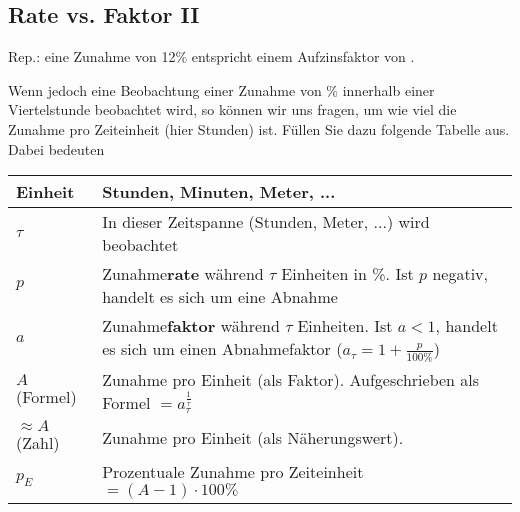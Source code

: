 \subsection{Rate vs. Faktor
  II}

Rep.: eine Zunahme von 12\% entspricht einem Aufzinsfaktor von .

Wenn jedoch eine Beobachtung einer Zunahme von \% innerhalb einer Viertelstunde beobachtet wird, so können wir uns fragen, um wie viel die Zunahme pro Zeiteinheit (hier Stunden) ist.
\newpage
Füllen Sie dazu folgende Tabelle aus. Dabei bedeuten

\begin{tabular}{lp{14cm}}\hline
  Einheit & Stunden, Minuten, Meter, ... \\\hline
  $\tau$  & In dieser Zeitspanne (Stunden, Meter, ...) wird beobachtet \\\hline
  $p$     & Zunahme\textbf{rate}\index{Zunahmerate}\index{Rate} während $\tau$ Einheiten in \%. Ist $p$ negativ, handelt es sich um eine Abnahme\\\hline
  $a$ & Zunahme\textbf{faktor}\index{Zunahmefaktor} während
  $\tau$ Einheiten. Ist $a<1$, handelt es sich um einen Abnahmefaktor
  ($a_{\tau} = 1+\frac{p}{100\%}$)\\\hline
  $A$ (Formel)   & Zunahme pro Einheit (als Faktor). Aufgeschrieben
  als Formel $=a_{\tau}^{\frac1{\tau}}$\\\hline
  $\approx A$ (Zahl)  & Zunahme pro Einheit (als Näherungswert).\\\hline
  $p_E$   & Prozentuale Zunahme pro Zeiteinheit $=(A-1)\cdot{}100\%$\\\hline
  \end{tabular} 

\leserluft{}
\leserluft{}
\newcommand{\ph}[1]{\noTRAINER{...........}\TRAINER{#1}}

